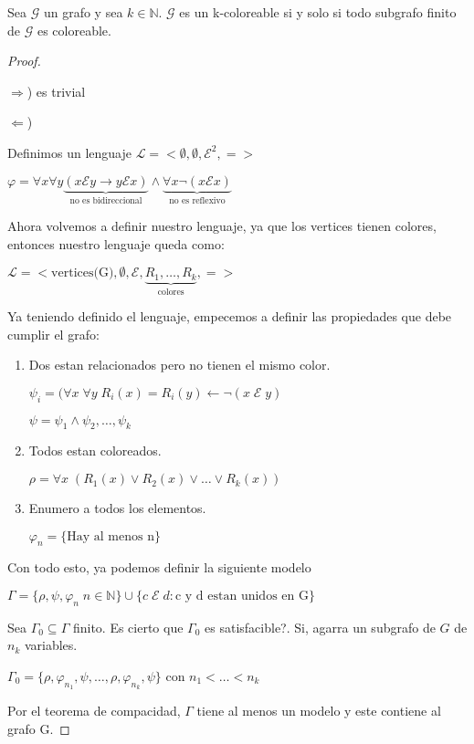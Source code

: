 \documentclass{amsart}
\begin{document}
\begin{ejercicio}
Sea $\mathcal{G}$ un grafo y sea $k \in \mathbb{N}$. $\mathcal{G}$ es un k-coloreable si y solo si todo subgrafo finito de $\mathcal{G}$ es coloreable.

\begin{proof}
$\;$

$\Rightarrow$) es trivial

$\Leftarrow$)

Definimos un lenguaje $\mathcal{L} = <\emptyset, \emptyset, \mathcal{E}^2, = >$

$\varphi = \forall x \forall y \underbrace{(x \mathcal{E} y \rightarrow y \mathcal{E} x)}_{\text{no es bidireccional}} \land \underbrace{ \forall x \neg (x \mathcal{E} x) }_{\text{no es reflexivo}}$

Ahora volvemos a definir nuestro lenguaje, ya que los vertices tienen colores, entonces nuestro lenguaje queda como:

$\mathcal{L} = <\text{vertices(G)}, \emptyset, \mathcal{E}, \underbrace{R_1, \ldots, R_k}_{\text{colores}}, = >$

Ya teniendo definido el lenguaje, empecemos a definir las propiedades que debe cumplir el grafo:

\begin{enumerate}
	\item Dos estan relacionados pero no tienen el mismo color.
	
	$\psi_i = (\forall x \; \forall y \; R_i(x) = R_i(y) \leftarrow \neg (x \; \mathcal{E} \; y)$ 
	
	$\psi = \psi_1 \land \psi_2, \ldots, \psi_k$
	
	\item Todos estan coloreados.
	
	$\rho = \forall x \; (R_1(x) \lor R_2(x) \lor \ldots \lor R_k(x))$
	
	\item Enumero a todos los elementos.
	
	$\varphi_n = \{ \text{Hay al menos n} \}$
	
\end{enumerate}
Con todo esto, ya podemos definir la siguiente modelo

$\Gamma = \{ \rho, \psi, \varphi_n \; n \in \mathbb{N} \} \cup \{ c \; \mathcal{E} \; d: \text{c y d estan unidos en G} \}$

Sea $\Gamma_0 \subseteq \Gamma$ finito. Es cierto que $\Gamma_0$ es satisfacible?. Si, agarra un subgrafo de $G$ de $n_k$ variables.

$\Gamma_0 = \{ \rho, \varphi_{n_1}, \psi, \ldots, \rho, \varphi_{n_k}, \psi \}$ con $n_1 < \ldots < n_k$

Por el teorema de compacidad, $\Gamma$ tiene al menos un modelo y este contiene al grafo G.

\end{proof}

\end{ejercicio}
\end{document}
